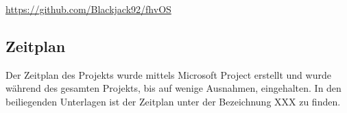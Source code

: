 \url{https://github.com/Blackjack92/fhvOS}
\linebreak

\subsection{Zeitplan}
Der Zeitplan des Projekts wurde mittels Microsoft Project erstellt und wurde während des gesamten Projekts, bis auf wenige Ausnahmen, eingehalten. In den beiliegenden Unterlagen ist der Zeitplan unter der Bezeichnung XXX zu finden.

\pagebreak 